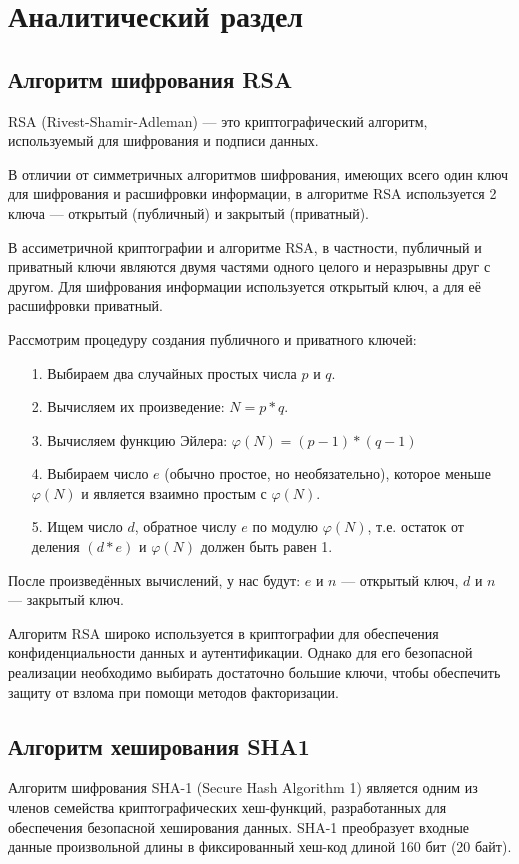 \chapter{Аналитический раздел}
\label{cha:analysis}

\section{Алгоритм шифрования RSA}
RSA (Rivest-Shamir-Adleman) --- это криптографический алгоритм, используемый для шифрования и подписи данных.

В отличии от симметричных алгоритмов шифрования, имеющих всего один ключ для шифрования и расшифровки информации, в алгоритме RSA используется 2 ключа --- открытый (публичный) и закрытый (приватный).

В ассиметричной криптографии и алгоритме RSA, в частности, публичный и приватный ключи являются двумя частями одного целого и неразрывны друг с другом. Для шифрования информации используется открытый ключ, а для её расшифровки приватный.

Рассмотрим процедуру создания публичного и приватного ключей:

\begin{enumerate}
	\item[1.] Выбираем два случайных простых числа $p$ и $q$.
	\item[2.] Вычисляем их произведение: $N = p * q$.
	\item[3.] Вычисляем функцию Эйлера: $\varphi(N) = (p-1) * (q-1)$
	\item[4.] Выбираем число $e$ (обычно простое, но необязательно), которое меньше $\varphi(N)$ и является взаимно простым с $\varphi(N)$.
	\item[5.] Ищем число $d$, обратное числу $e$ по модулю $\varphi(N)$, т.е. остаток от деления $(d*e)$ и $\varphi(N)$ должен быть равен 1.
\end{enumerate}

После произведённых вычислений, у нас будут: $e$ и $n$ --- открытый ключ, $d$ и $n$ --- закрытый ключ.

Алгоритм RSA широко используется в криптографии для обеспечения конфиденциальности данных и аутентификации. Однако для его безопасной реализации необходимо выбирать достаточно большие ключи, чтобы обеспечить защиту от взлома при помощи методов факторизации.

\section{Алгоритм хеширования SHA1}
Алгоритм шифрования SHA-1 (Secure Hash Algorithm 1) является одним из членов семейства криптографических хеш-функций, разработанных для обеспечения безопасной хеширования данных. SHA-1 преобразует входные данные произвольной длины в фиксированный хеш-код длиной 160 бит (20 байт).

